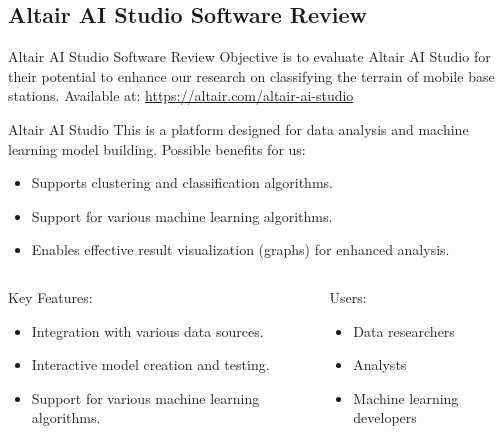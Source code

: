 \subsection{Altair AI Studio Software Review}
\insertsubsectionframe

\begin{frame}{Altair AI Studio Software Review}
    Objective is to evaluate Altair AI Studio for their potential to enhance our research on classifying the terrain of mobile base stations.
    Available at: \url{https://altair.com/altair-ai-studio}
    \begin{block}{Altair AI Studio}
        This is a platform designed for data analysis and machine learning model building. Possible benefits for us:
        \begin{itemize}
            \item Supports clustering and classification algorithms.
            \item Support for various machine learning algorithms.
            \item Enables effective result visualization (graphs) for enhanced analysis.
        \end{itemize}
    \end{block}
    \begin{columns}
        \begin{column}{0.4\paperwidth}
            \begin{block}{Key Features:}
                \begin{itemize}
                    \item Integration with various data sources.
                    \item Interactive model creation and testing.
                    \item Support for various machine learning algorithms.
                \end{itemize}
            \end{block}
        \end{column}
        \begin{column}{0.4\paperwidth}
            \begin{block}{Users:}
                \begin{itemize}
                    \item Data researchers
                    \item Analysts
                    \item Machine learning developers
                \end{itemize}
            \end{block}
        \end{column}
    \end{columns}
\end{frame}

